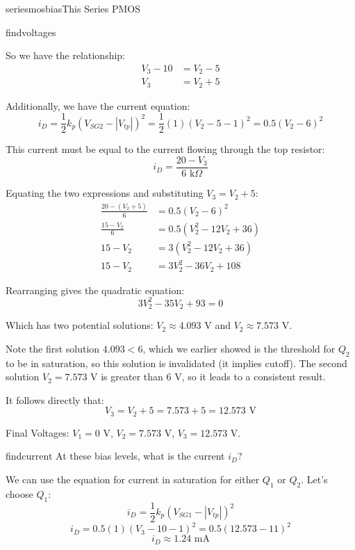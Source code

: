 \begin{mainquestion}{seriesmosbias}{This Series PMOS}
\begin{partquestion}{findvoltages}
\begin{answer}
        So we have the relationship:
        \begin{align*}
            V_3 - 10 &= V_2 - 5 \\
            V_3 &= V_2 + 5
        \end{align*}
        
        Additionally, we have the current equation:
        \[ i_D = \frac{1}{2} k_p (V_{SG2} - |V_{tp}|)^2 = \frac{1}{2}(1)(V_2 - 5 - 1)^2 = 0.5(V_2 - 6)^2 \]
        
        This current must be equal to the current flowing through the top resistor:
        \[ i_D = \frac{20 - V_3}{6\text{ k}\Omega} \]
        
        Equating the two expressions and substituting $V_3 = V_2 + 5$:
        \begin{align*}
            \frac{20 - (V_2 + 5)}{6} &= 0.5(V_2 - 6)^2 \\
            \frac{15 - V_2}{6} &= 0.5(V_2^2 - 12V_2 + 36) \\
            15 - V_2 &= 3(V_2^2 - 12V_2 + 36) \\
            15 - V_2 &= 3V_2^2 - 36V_2 + 108
        \end{align*}
        
        Rearranging gives the quadratic equation:
        \[ 3V_2^2 - 35V_2 + 93 = 0 \]
        
        Which has two potential solutions: $V_2 \approx 4.093\text{ V}$ and $V_2 \approx 7.573\text{ V}$.
        
        Note the first solution $4.093 < 6$, which we earlier showed is the threshold for $Q_2$ to be in saturation, so this solution is invalidated (it implies cutoff). The second solution $V_2 = 7.573\text{ V}$ is greater than $6\text{ V}$, so it leads to a consistent result.
        
        It follows directly that:
        \[ V_3 = V_2 + 5 = 7.573 + 5 = 12.573\text{ V} \]
        
        Final Voltages: $V_1 = 0\text{ V}$, $V_2 = 7.573\text{ V}$, $V_3 = 12.573\text{ V}$.
\end{answer}

\end{partquestion}

\begin{partquestion}{findcurrent}
{At these bias levels, what is the current $i_D$?}

\begin{answer}
        We can use the equation for current in saturation for either $Q_1$ or $Q_2$. Let's choose $Q_1$:
        \[ i_D = \frac{1}{2} k_p (V_{SG1} - |V_{tp}|)^2 \]
        \[ i_D = 0.5(1)(V_3 - 10 - 1)^2 = 0.5(12.573 - 11)^2 \]
        \[ i_D \approx 1.24\text{ mA} \]
\end{answer}

\end{partquestion}

\end{mainquestion}
